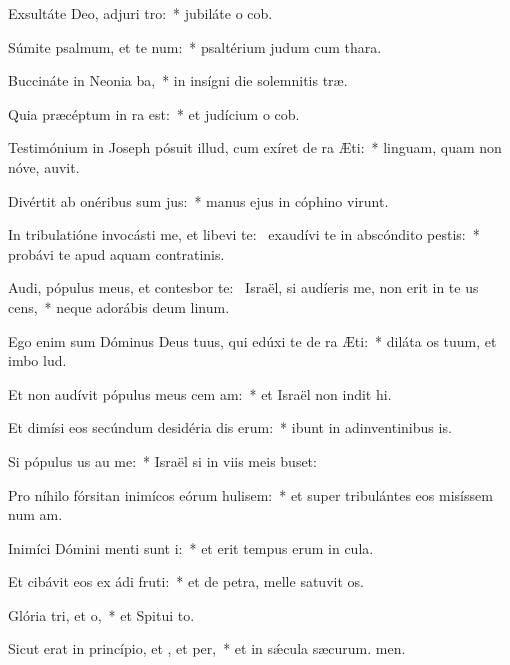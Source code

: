 \item Exsultáte Deo, adjuri tro:~* jubiláte o cob.
\item Súmite psalmum, et te num:~* psaltérium judum cum thara.
\item Buccináte in Neonia ba,~* in insígni die solemnitis træ.
\item Quia præcéptum in ra est:~* et judícium o cob.
\item Testimónium in Joseph pósuit illud, cum exíret de ra Æti:~* linguam, quam non nóve, auvit.
\item Divértit ab onéribus sum jus:~* manus ejus in cóphino virunt.
\item In tribulatióne invocásti me, et libevi te:~\pscross{} exaudívi te in abscóndito pestis:~* probávi te apud aquam contratinis.
\item Audi, pópulus meus, et contesbor te:~\pscross{} Israël, si audíeris me, non erit in te us cens,~* neque adorábis deum linum.
\item Ego enim sum Dóminus Deus tuus, qui edúxi te de ra Æti:~* diláta os tuum, et imbo lud.
\item Et non audívit pópulus meus cem am:~* et Israël non indit hi.
\item Et dimísi eos secúndum desidéria dis erum:~* ibunt in adinventinibus is.
\item Si pópulus us au me:~* Israël si in viis meis buset:
\item Pro níhilo fórsitan inimícos eórum hulisem:~* et super tribulántes eos misíssem num am.
\item Inimíci Dómini menti sunt i:~* et erit tempus erum in cula.
\item Et cibávit eos ex ádi fruti:~* et de petra, melle satuvit os.
\item Glória tri, et o,~* et Spitui to.
\item Sicut erat in princípio, et , et per,~* et in sǽcula sæcurum. men.
